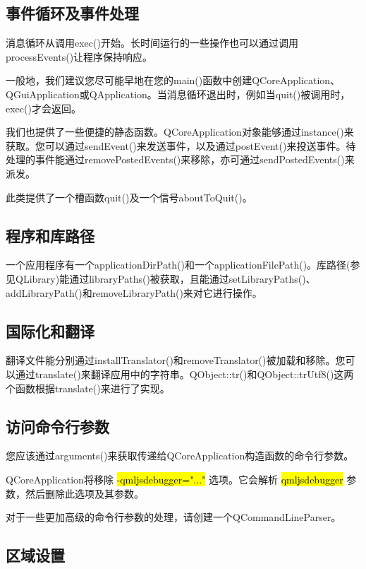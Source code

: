 \subsection{事件循环及事件处理}

消息循环从调用exec()开始。长时间运行的一些操作也可以通过调用processEvents()让程序保持响应。

一般地，我们建议您尽可能早地在您的main()函数中创建QCoreApplication、QGuiApplication或QApplication。当消息循环退出时，例如当quit()被调用时，exec()才会返回。

我们也提供了一些便捷的静态函数。QCoreApplication对象能够通过instance()来获取。您可以通过sendEvent()来发送事件，以及通过postEvent()来投送事件。待处理的事件能通过removePostedEvents()来移除，亦可通过sendPostedEvents()来派发。

此类提供了一个槽函数quit()及一个信号aboutToQuit()。

\subsection{程序和库路径}

一个应用程序有一个applicationDirPath()和一个applicationFilePath()。库路径(参见QLibrary)能通过libraryPaths()被获取，且能通过setLibraryPaths()、addLibraryPath()和removeLibraryPath()来对它进行操作。

\subsection{国际化和翻译}

翻译文件能分别通过installTranslator()和removeTranslator()被加载和移除。您可以通过translate()来翻译应用中的字符串。QObject::tr()和QObject::trUtf8()这两个函数根据translate()来进行了实现。

\subsection{访问命令行参数}

您应该通过arguments()来获取传递给QCoreApplication构造函数的命令行参数。

\begin{notice}
QCoreApplication将移除 \hl{-qmljsdebugger="..."} 选项。它会解析
\hl{qmljsdebugger} 参数，然后删除此选项及其参数。
\end{notice}


对于一些更加高级的命令行参数的处理，请创建一个QCommandLineParser。

\subsection{区域设置}

